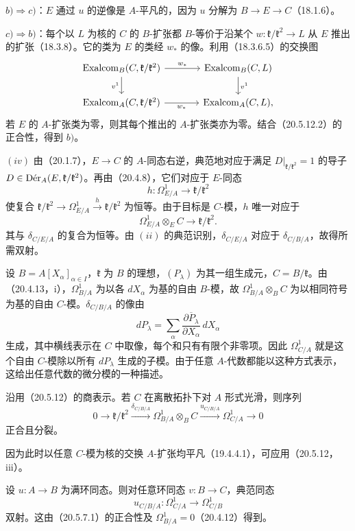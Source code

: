 $b)\Rightarrow c)$：$E$ 通过 $u$ 的逆像是 $A$-平凡的，因为 $u$ 分解为 $B\to E\to C$（18.1.6）。

$c)\Rightarrow b)$：每个以 $L$ 为核的 $C$ 的 $B$-扩张都 $B$-等价于沿某个 $w:\mathfrak k/\mathfrak k^2\to L$ 从 $E$ 推出的扩张（18.3.8）。它的类为 $E$ 的类经 $w_*$ 的像。利用（18.3.6.5）的交换图
\[
\begin{tikzcd}[column sep=large]
 \Exalcom_B(C,\mathfrak k/\mathfrak k^2)\arrow[r,"w_*"]\arrow[d,"v^1"']&\Exalcom_B(C,L)\arrow[d,"v^1"]\\
 \Exalcom_A(C,\mathfrak k/\mathfrak k^2)\arrow[r,"w_*"']&\Exalcom_A(C,L),
\end{tikzcd}
\]
若 $E$ 的 $A$-扩张类为零，则其每个推出的 $A$-扩张类亦为零。结合（20.5.12.2）的正合性，得到 $b)$。

$(iv)$ 由（20.1.7），$E\to C$ 的 $A$-同态右逆，典范地对应于满足 $D|_{\mathfrak k/\mathfrak k^2}=1$ 的导子
$D\in\Der_A(E,\mathfrak k/\mathfrak k^2)$。再由（20.4.8），它们对应于 $E$-同态
\[
 h:\Omega^1_{E/A}\longrightarrow\mathfrak k/\mathfrak k^2
\]
使复合 $\mathfrak k/\mathfrak k^2\to\Omega^1_{E/A}\xrightarrow{h}\mathfrak k/\mathfrak k^2$ 为恒等。由于目标是 $C$-模，$h$ 唯一对应于
\[
 \Omega^1_{E/A}\otimes_E C\longrightarrow\mathfrak k/\mathfrak k^2.
\]
其与 $\delta_{C/E/A}$ 的复合为恒等。由 $(ii)$ 的典范识别，$\delta_{C/E/A}$ 对应于 $\delta_{C/B/A}$，故得所需双射。

设 $B=A[X_\alpha]_{\alpha\in I}$，$\mathfrak k$ 为 $B$ 的理想，$(P_\lambda)$ 为其一组生成元，$C=B/\mathfrak k$。由（20.4.13，i），$\Omega^1_{B/A}$ 为以各 $dX_\alpha$ 为基的自由 $B$-模，故 $\Omega^1_{B/A}\otimes_B C$ 为以相同符号为基的自由 $C$-模。$\delta_{C/B/A}$ 的像由
\[
 dP_\lambda=\sum_\alpha
 \overline{\frac{\partial P_\lambda}{\partial X_\alpha}}\,dX_\alpha
\]
生成，其中横线表示在 $C$ 中取像，每个和只有有限个非零项。因此 $\Omega^1_{C/A}$ 就是这个自由 $C$-模除以所有 $dP_\lambda$ 生成的子模。由于任意 $A$-代数都能以这种方式表示，这给出任意代数的微分模的一种描述。

沿用（20.5.12）的商表示。若 $C$ 在离散拓扑下对 $A$ 形式光滑，则序列
\begin{equation}
0\longrightarrow\mathfrak k/\mathfrak k^2
 \xrightarrow{\delta_{C/B/A}}\Omega^1_{B/A}\otimes_B C
 \xrightarrow{u_{C/B/A}}\Omega^1_{C/A}\longrightarrow0
\tag{20.5.14.1}
\end{equation}
正合且分裂。

因为此时以任意 $C$-模为核的交换 $A$-扩张均平凡（19.4.4.1），可应用（20.5.12，iii）。

设 $u:A\to B$ 为满环同态。则对任意环同态 $v:B\to C$，典范同态
\begin{equation}
 u_{C/B/A}:\Omega^1_{C/A}\longrightarrow\Omega^1_{C/B}
 \tag{20.5.15.1}
\end{equation}
双射。这由（20.5.7.1）的正合性及 $\Omega^1_{B/A}=0$（20.4.12）得到。
